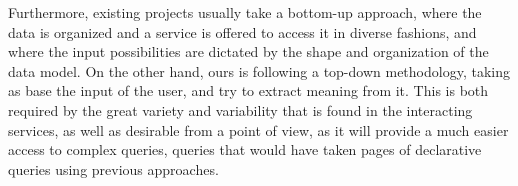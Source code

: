 Furthermore, existing projects usually take a bottom-up approach, where the data is organized and a service is offered to access it in diverse fashions, and where the input possibilities are dictated by the shape and organization of the data model. On the other hand, ours is following a top-down methodology, taking as base the input of the user, and try to extract meaning from it. This is both required by the great variety and variability that is found in the interacting services, as well as desirable from a point of view, as it will provide a much easier access to complex queries, queries that would have taken pages of declarative queries using previous approaches.


